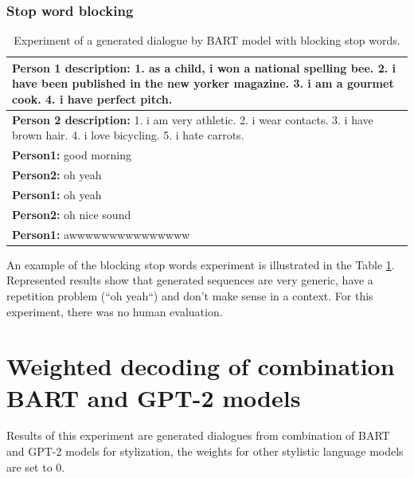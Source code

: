 \subsubsection{Stop word blocking}
\begin{table}[H]
\centering
 \begin{tabular}{|p{14cm}|} 
 \hline
 \textbf{Person 1 description:} 1. as a child, i won a national spelling bee. 2. i have been published in the new yorker magazine. 3. i am a gourmet cook. 4. i have perfect pitch. \\
 \hline
 \textbf{Person 2 description:} 1. i am very athletic. 2. i wear contacts. 3. i have brown hair. 4. i love bicycling. 5. i hate carrots. \\
 \hline
 \textbf{Person1:} good morning \\
 \textbf{Person2:} oh yeah \\
 \textbf{Person1:} oh yeah \\
 \textbf{Person2:} oh nice sound \\
 \textbf{Person1:} awwwwwwwwwwwwwww \\
 \hline
 \end{tabular}
 \caption{Experiment of a generated dialogue by BART model with blocking stop words.}
\label{tab:stop_words}
\end{table}
An example of the blocking stop words experiment is illustrated in the Table \ref{tab:stop_words}. Represented results show that generated sequences are very generic, have a repetition problem (``oh yeah``) and don't make sense in a context. For this experiment, there was no human evaluation.

\section{Weighted decoding of combination BART and GPT-2 models} \label{sec_wd}
Results of this experiment are generated dialogues from combination of BART and GPT-2 models for stylization, the weights for other stylistic language models are set to 0.

